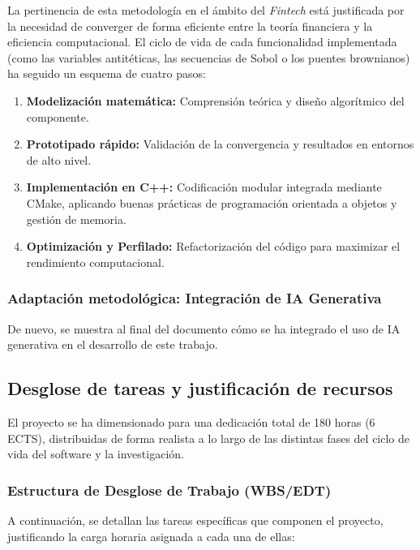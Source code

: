 \documentclass[11pt]{article}
\begin{document}
La pertinencia de esta metodología en el ámbito del \textit{Fintech} está justificada por la necesidad de converger de forma eficiente entre la teoría financiera y la eficiencia computacional. El ciclo de vida de cada funcionalidad implementada (como las variables antitéticas, las secuencias de Sobol o los puentes brownianos) ha seguido un esquema de cuatro pasos:
\begin{enumerate}
    \item \textbf{Modelización matemática:} Comprensión teórica y diseño algorítmico del componente.
    \item \textbf{Prototipado rápido:} Validación de la convergencia y resultados en entornos de alto nivel.
    \item \textbf{Implementación en C++:} Codificación modular integrada mediante CMake, aplicando buenas prácticas de programación orientada a objetos y gestión de memoria.
    \item \textbf{Optimización y Perfilado:} Refactorización del código para maximizar el rendimiento computacional.
\end{enumerate}

\subsubsection*{Adaptación metodológica: Integración de IA Generativa}
De nuevo, se muestra al final del documento cómo se ha integrado el uso de IA generativa en el desarrollo de este trabajo.

\subsection{Desglose de tareas y justificación de recursos}

El proyecto se ha dimensionado para una dedicación total de 180 horas (6 ECTS), distribuidas de forma realista a lo largo de las distintas fases del ciclo de vida del software y la investigación.

\subsubsection{Estructura de Desglose de Trabajo (WBS/EDT)}
A continuación, se detallan las tareas específicas que componen el proyecto, justificando la carga horaria asignada a cada una de ellas:
\end{document}
